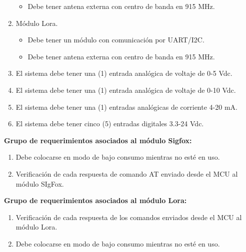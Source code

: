 \begin{enumerate}
\begin{itemize}
			\item Debe tener antena externa con centro de banda en 915 MHz.

		\end{itemize}

	\item Módulo Lora.

		\begin{itemize}

			\item Debe tener un módulo con comunicación por UART/I2C.

			\item Debe tener antena externa con centro de banda en 915 MHz.

		\end{itemize}

		\item El sistema debe tener una (1) entrada analógica de voltaje de 0-5 Vdc.
		
		\item El sistema debe tener una (1) entrada analógica de voltaje de 0-10 Vdc.

		\item El sistema debe tener una (1) entradas analógicas de corriente 4-20 mA.

		\item El sistema debe tener cinco (5) entradas digitales 3.3-24 Vdc.

\end{enumerate}



\textbf{Grupo de requerimientos asociados al módulo Sigfox:}

	\begin{enumerate}

		\item Debe colocarse en modo de bajo consumo mientras no esté en uso.

		\item Verificación de cada respuesta de comando AT enviado desde el MCU al módulo SIgFox.

	\end{enumerate}





\textbf{Grupo de requerimientos asociados al módulo Lora:}

	\begin{enumerate}

		\item Verificación de cada respuesta de los comandos enviados desde el MCU al módulo Lora.

		\item Debe colocarse en modo de bajo consumo mientras no esté en uso.

	\end{enumerate}



